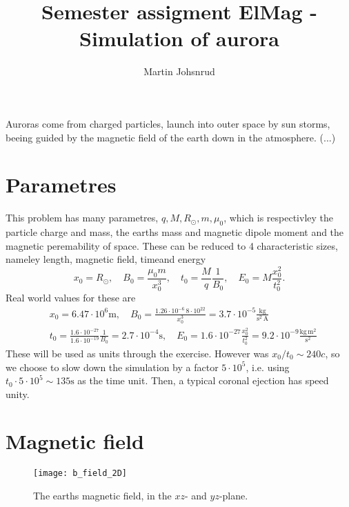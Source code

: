 \documentclass{article}
\title{Semester assigment ElMag - Simulation of aurora}
\author{Martin Johsnrud}
\begin{document}
    \maketitle

    Auroras come from charged particles, launch into outer space by sun storms, beeing guided by the magnetic field of the earth down in the atmosphere. (...) 
    
    \section*{Parametres}
        This problem has many parametres, $q, M, R_{\odot}, m, \mu_0$, which is respectivley the particle charge and mass, the earths mass and magnetic dipole moment and the magnetic peremability of space. These can be reduced to 4 characteristic sizes, nameley length, magnetic field, timeand energy
        \begin{equation*}
            x_0 = R_{\odot}, \quad  B_0 = \frac{\mu_0 m}{x_0^3}, \quad t_0 = \frac{M}{q}\frac{1}{B_0},  \quad E_0 = M\frac{ x_0^2}{t_0^2}.
        \end{equation*}
        Real world values for these are  
        \begin{align*}
            & x_0 = 6.47 \cdot 10^6 \textrm{m}, \quad
            B_0 = \frac{1.26 \cdot 10^{-6} \, 8 \cdot 10^{22}}{x_0^3} = 3.7 \cdot 10^{-5} \frac{\textrm{kg}}{\textrm{s}^{2} \, \textrm{A}} \\
            &t_0 = \frac{1.6 \cdot 10^{-27}}{1.6\cdot10^{-19}}\frac{1}{B_0} = 2.7 \cdot 10^{-4} \textrm{s}, \quad 
            E_0 = 1.6 \cdot 10^{-27} \frac{x_0^2}{t_0^2} = 9.2 \cdot 10^{-9} \frac{\textrm{kg} \, \textrm{m}^2}{\textrm{s}^2}
        \end{align*}
        These will be used as units through the exercise. However was $x_0 / t_0 \sim 240 c$, so we choose to slow down the simulation by a factor $ 5\cdot 10^5$, i.e. using $t_0 \cdot 5\cdot 10^5 \sim 135 \textrm{s}$ as the time unit. Then, a typical coronal ejection has speed unity.

    \section*{Magnetic field}

    \begin{figure}
        \centering    
        \texttt{[image: b\_field\_2D]}
        \caption{The earths magnetic field, in the $xz$- and $yz$-plane.  }
        \label{B-field}
    \end{figure}
\end{document}
